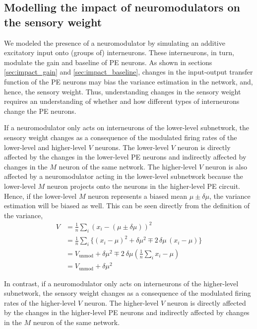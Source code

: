 \documentclass[10pt,a4paper]{article}
\begin{document}
\subsection{Modelling the impact of neuromodulators on the sensory weight}
%
We modeled the presence of a neuromodulator by simulating an additive excitatory input onto (groups of) interneurons. These interneurons, in turn, modulate the gain and baseline of PE neurons. As shown in sections \ref{sec:impact_gain} and \ref{sec:impact_baseline}, changes in the input-output transfer function of the PE neurons may bias the variance estimation in the network, and, hence, the sensory weight. Thus, understanding changes in the sensory weight requires an understanding of whether and how different types of interneurons change the PE neurons.

If a neuromodulator only acts on interneurons of the lower-level subnetwork, the sensory weight changes as a consequence of the modulated firing rates of the lower-level and higher-level $V$ neurons. The lower-level $V$ neuron is directly affected by the changes in the lower-level PE neurons and indirectly affected by changes in the $M$ neuron of the same network. The higher-level $V$ neuron is also affected by a neuromodulator acting in the lower-level subnetwork because the lower-level $M$ neuron projects onto the neurons in the higher-level PE circuit. Hence, if the lower-level $M$ neuron represents a biased mean $\mu \pm \delta\mu$, the variance estimation will be biased as well. This can be seen directly from the definition of the variance,
%
\begin{align*}
V &= \frac{1}{n} \sum_i \left( x_i - \left(\mu \pm \delta\mu\right)\right)^2 \\
&= \frac{1}{n} \sum_i \lbrace  \left( x_i - \mu \right)^2 + \delta\mu^2 \mp 2\, \delta\mu\,  (x_i - \mu)\rbrace \\
&= V_\mathrm{unmod} + \delta\mu^2 \mp 2\ \delta\mu \left( \frac{1}{n} \sum_i x_i- \mu\right) \\
&= V_\mathrm{unmod} + \delta\mu^2
\end{align*}
%

In contrast, if a neuromodulator only acts on interneurons of the higher-level subnetwork, the sensory weight changes as a consequence of the modulated firing rates of the higher-level $V$ neuron. The higher-level $V$ neuron is directly affected by the changes in the higher-level PE neurons and indirectly affected by changes in the $M$ neuron of the same network.
\end{document}
